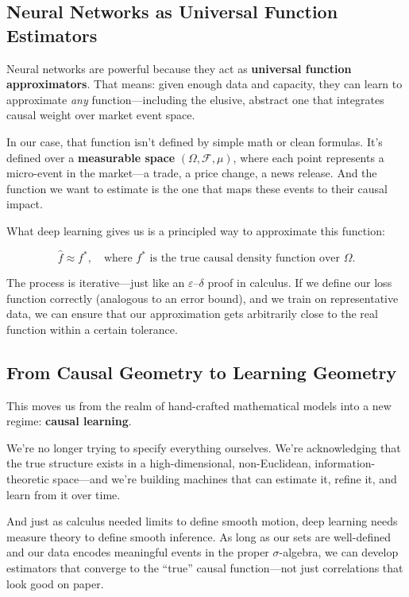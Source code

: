 \subsection{Neural Networks as Universal Function Estimators}

Neural networks are powerful because they act as \textbf{universal function approximators}. That means: given enough data and capacity, they can learn to approximate \textit{any} function—including the elusive, abstract one that integrates causal weight over market event space.

In our case, that function isn't defined by simple math or clean formulas. It's defined over a \textbf{measurable space} \( (\Omega, \mathcal{F}, \mu) \), where each point represents a micro-event in the market—a trade, a price change, a news release. And the function we want to estimate is the one that maps these events to their causal impact.

What deep learning gives us is a principled way to approximate this function:

\[
\hat{f} \approx f^*, \quad \text{where } f^* \text{ is the true causal density function over } \Omega.
\]

The process is iterative—just like an \(\varepsilon\)--\(\delta\) proof in calculus. If we define our loss function correctly (analogous to an error bound), and we train on representative data, we can ensure that our approximation gets arbitrarily close to the real function within a certain tolerance.

\subsection{From Causal Geometry to Learning Geometry}

This moves us from the realm of hand-crafted mathematical models into a new regime: \textbf{causal learning}.

We're no longer trying to specify everything ourselves. We're acknowledging that the true structure exists in a high-dimensional, non-Euclidean, information-theoretic space—and we're building machines that can estimate it, refine it, and learn from it over time.

And just as calculus needed limits to define smooth motion, deep learning needs measure theory to define smooth inference. As long as our sets are well-defined and our data encodes meaningful events in the proper \(\sigma\)-algebra, we can develop estimators that converge to the ``true'' causal function—not just correlations that look good on paper.

